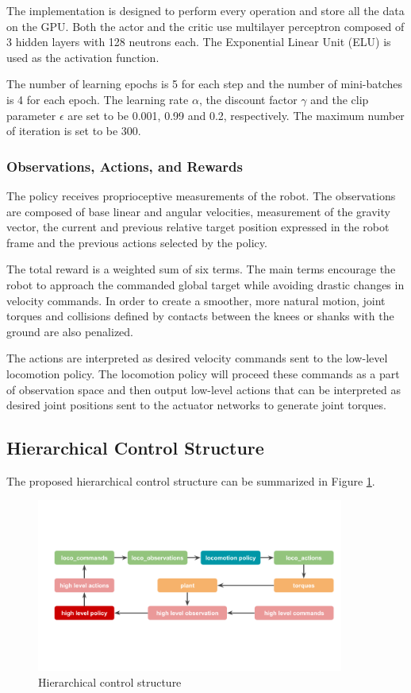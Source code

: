 \documentclass{article}
\begin{document}
The implementation is designed to perform every operation and store all the data on the GPU. Both the actor and the critic use multilayer perceptron composed of 3 hidden layers with 128 neutrons each. The Exponential Linear Unit (ELU) is used as the activation function.

The number of learning epochs is 5 for each step and the number of mini-batches is 4 for each epoch. The learning rate $\alpha$, the discount factor $\gamma$ and the clip parameter $\epsilon$ are set to be 0.001, 0.99 and 0.2, respectively. The maximum number of iteration is set to be 300.

\subsubsection{Observations, Actions, and Rewards}
The policy receives proprioceptive measurements of the robot. The observations are composed of base linear and angular velocities, measurement of the gravity vector, the current and previous relative target position expressed in the robot frame and the previous actions selected by the policy.

The total reward is a weighted sum of six terms. The main terms encourage the robot to approach the commanded global target while avoiding drastic changes in velocity commands. In order to create a smoother, more natural motion, joint torques and collisions defined by contacts between the knees or shanks with the ground are also penalized.

The actions are interpreted as desired velocity commands sent to the low-level locomotion policy. The locomotion policy will proceed these commands as a part of observation space and then output low-level actions that can be interpreted as desired joint positions sent to the actuator networks to generate joint torques.

\subsection{Hierarchical Control Structure}
The proposed hierarchical control structure can be summarized in Figure \ref{fig:hcs}.

\begin{figure}[htbp]
	\centering
	\includegraphics[width=0.9\textwidth]{Project/figs/Hierarchical Control Strategy.png} 
	\caption{Hierarchical control structure}
	\label{fig:hcs}
\end{figure}
\end{document}
